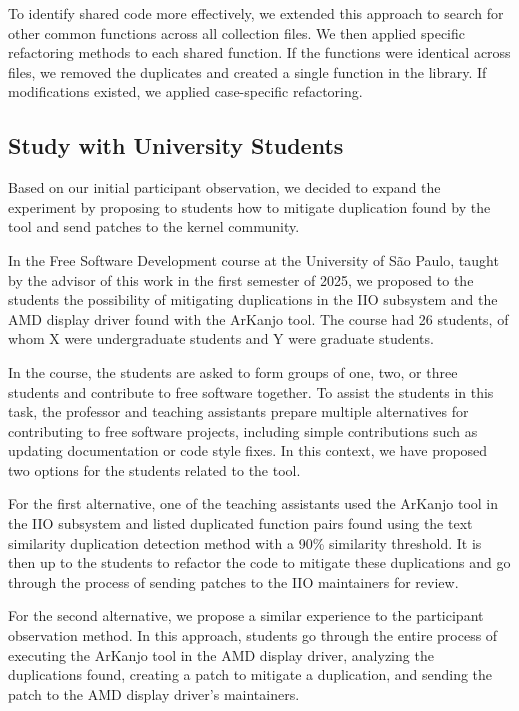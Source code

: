 To identify shared code more effectively, we extended this approach to search for other common 
functions across all collection files. We then applied specific refactoring methods to each shared 
function. If the functions were identical across files, we removed the duplicates and created a single 
function in the library. If modifications existed, we applied case-specific refactoring.

\subsection{Study with University Students}

Based on our initial participant observation, we decided to expand the experiment by proposing 
to students how to mitigate duplication found by the tool and send patches to the kernel community.

In the Free Software Development course at the University of São Paulo, taught by the advisor of 
this work in the first semester of 2025, we proposed to the students the possibility of mitigating 
duplications in the IIO subsystem and the AMD display driver found with the ArKanjo tool. 
The course had 26 students, of whom X were undergraduate students and Y were graduate students.

In the course, the students are asked to form groups of one, two, or three students and contribute 
to free software together. To assist the students in this task, the professor and teaching assistants 
prepare multiple alternatives for contributing to free software projects, including simple contributions 
such as updating documentation or code style fixes. In this context, we have proposed two options 
for the students related to the tool.

For the first alternative, one of the teaching assistants used the ArKanjo tool in the IIO subsystem 
and listed duplicated function pairs found using the text similarity duplication detection method with 
a 90\% similarity threshold. It is then up to the students to refactor the code to mitigate these 
duplications and go through the process of sending patches to the IIO maintainers for review.

For the second alternative, we propose a similar experience to the participant observation method. 
In this approach, students go through the entire process of executing the ArKanjo tool in the 
AMD display driver, analyzing the duplications found, creating a patch to mitigate a duplication, 
and sending the patch to the AMD display driver’s maintainers.

